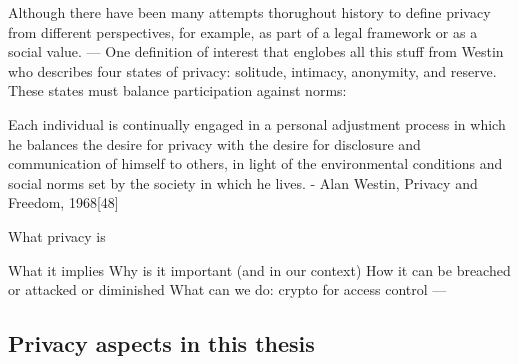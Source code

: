 \documentclass[showtrims,oldfontcommands]{kthesis}
\begin{document}
Although there have been many attempts thorughout history to define privacy from different
perspectives, for example, as part of a legal framework or as a social value.
---
One definition of interest that englobes all this stuff from Westin who describes 
four states of privacy: solitude, intimacy, anonymity, and reserve. These states must balance participation against norms:


Each individual is continually engaged in a personal adjustment process in which he balances the desire for privacy with the desire for disclosure and communication of himself to others, in light of the environmental conditions and social norms set by the society in which he lives. - Alan Westin, Privacy and Freedom, 1968[48]


What privacy is


What it implies
Why is it important (and in our context)
How it can be breached or attacked or diminished
What can we do: crypto for access control
---

%
%
%

\subsection{Privacy aspects in this thesis}
\end{document}
